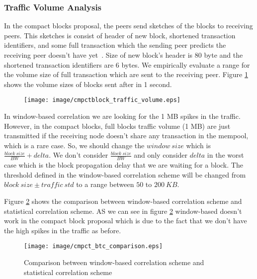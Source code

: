 \subsubsection{Traffic Volume Analysis}
In the compact blocks proposal, the peers send sketches of the blocks to receiving peers. This sketches is consist of header of new block, shortened transaction identifiers, and some full transaction which the sending peer predicts the receiving peer doesn't have yet~\cite{compactblock}. Size of new block's header is 80 byte and the shortened transaction identifiers are 6 bytes.  We empirically evaluate a range for the volume size of full transaction which are sent to the receiving peer. Figure \ref{fig:cmpctblock_traffic_volume} shows the volume sizes of blocks sent after  in 1 second. 
\begin{figure}
\centering
\texttt{[image: image/cmpctblock\_traffic\_volume.eps]}
\caption{}
\label{fig:cmpctblock_traffic_volume}
\end{figure}
\par In window-based correlation we are looking for the 1 MB spikes in the traffic. However, in the compact blocks, full blocks traffic volume (1 MB) are just transmitted if the receiving node doesn't share any transaction in the mempool, which is a rare case.  So, we should change the $window \ size$ which is $\frac{block\ size}{BW} + delta$. We don't consider $\frac{block\ size}{BW}$ and only consider $delta$ in the worst case which is the block propagation delay that we are waiting for a block. The threshold defined in the window-based correlation scheme will be changed from $block\ size \pm traffic \ std $ to a range between $50$ to $200 \ KB$. 
\par Figure  \ref{fig:cmpct_btc_comparison} shows the comparison between window-based correlation scheme and statistical correlation scheme. AS we can see in figure \ref{fig:cmpct_btc_comparison} window-based doesn't work in the compact block proposal which is due to the fact that we don't have the high spikes in the traffic as before. 
\begin{figure}
\centering
\texttt{[image: image/cmpct\_btc\_comparison.eps]}
\caption{Comparison between window-based correlation scheme and statistical correlation scheme}
\label{fig:cmpct_btc_comparison}
\end{figure}

